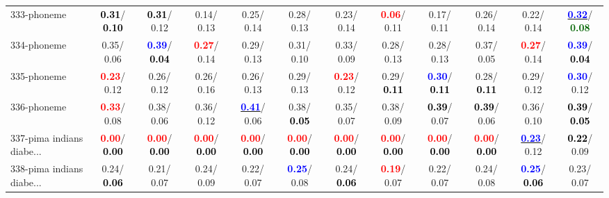 \begin{table}[h]
\begin{center}
{\begin{tabular}{lc|c|c|c|c|c|c|c|c|c|c}
333-phoneme & \textcolor{black}{\textbf{  0.31}}/\textcolor{black}{\textbf{  0.10}} & \textcolor{black}{\textbf{  0.31}}/  0.12 &   0.14/  0.13 &   0.25/  0.14 &   0.28/  0.13 &   0.23/  0.14 & \textcolor{red}{\textbf{  0.06}}/  0.11 &   0.17/  0.11 &   0.26/  0.14 &   0.22/  0.14 & \underline{\textcolor{blue}{\textbf{  0.32}}}/\textcolor{darkgreen}{\textbf{  0.08}} \\
334-phoneme &   0.35/  0.06 & \textcolor{blue}{\textbf{  0.39}}/\textcolor{black}{\textbf{  0.04}} & \textcolor{red}{\textbf{  0.27}}/  0.14 &   0.29/  0.13 &   0.31/  0.10 &   0.33/  0.09 &   0.28/  0.13 &   0.28/  0.13 &   0.37/  0.05 & \textcolor{red}{\textbf{  0.27}}/  0.14 & \textcolor{blue}{\textbf{  0.39}}/\textcolor{black}{\textbf{  0.04}} \\ \hline
335-phoneme & \textcolor{red}{\textbf{  0.23}}/  0.12 &   0.26/  0.12 &   0.26/  0.16 &   0.26/  0.13 &   0.29/  0.13 & \textcolor{red}{\textbf{  0.23}}/  0.12 &   0.29/\textcolor{black}{\textbf{  0.11}} & \textcolor{blue}{\textbf{  0.30}}/\textcolor{black}{\textbf{  0.11}} &   0.28/\textcolor{black}{\textbf{  0.11}} &   0.29/  0.12 & \textcolor{blue}{\textbf{  0.30}}/  0.12 \\
336-phoneme & \textcolor{red}{\textbf{  0.33}}/  0.08 &   0.38/  0.06 &   0.36/  0.12 & \underline{\textcolor{blue}{\textbf{  0.41}}}/  0.06 &   0.38/\textcolor{black}{\textbf{  0.05}} &   0.35/  0.07 &   0.38/  0.09 & \textcolor{black}{\textbf{  0.39}}/  0.07 & \textcolor{black}{\textbf{  0.39}}/  0.06 &   0.36/  0.10 & \textcolor{black}{\textbf{  0.39}}/\textcolor{black}{\textbf{  0.05}} \\
337-pima indians diabe... & \textcolor{red}{\textbf{  0.00}}/\textcolor{black}{\textbf{  0.00}} & \textcolor{red}{\textbf{  0.00}}/\textcolor{black}{\textbf{  0.00}} & \textcolor{red}{\textbf{  0.00}}/\textcolor{black}{\textbf{  0.00}} & \textcolor{red}{\textbf{  0.00}}/\textcolor{black}{\textbf{  0.00}} & \textcolor{red}{\textbf{  0.00}}/\textcolor{black}{\textbf{  0.00}} & \textcolor{red}{\textbf{  0.00}}/\textcolor{black}{\textbf{  0.00}} & \textcolor{red}{\textbf{  0.00}}/\textcolor{black}{\textbf{  0.00}} & \textcolor{red}{\textbf{  0.00}}/\textcolor{black}{\textbf{  0.00}} & \textcolor{red}{\textbf{  0.00}}/\textcolor{black}{\textbf{  0.00}} & \underline{\textcolor{blue}{\textbf{  0.23}}}/  0.12 & \textcolor{black}{\textbf{  0.22}}/  0.09 \\
338-pima indians diabe... &   0.24/\textcolor{black}{\textbf{  0.06}} &   0.21/  0.07 &   0.24/  0.09 &   0.22/  0.07 & \textcolor{blue}{\textbf{  0.25}}/  0.08 &   0.24/\textcolor{black}{\textbf{  0.06}} & \textcolor{red}{\textbf{  0.19}}/  0.07 &   0.22/  0.07 &   0.24/  0.08 & \textcolor{blue}{\textbf{  0.25}}/\textcolor{black}{\textbf{  0.06}} &   0.23/  0.07 \\

\end{tabular}}
\end{center}
\end{table}
